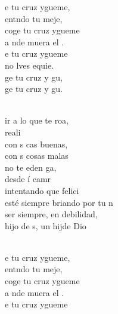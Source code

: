 \begin{cancion}%
	\begin{chorus}%
	e tu cruz ygueme,  \\
	entndo tu meje, \\
	coge tu cruz ygueme  \\
	a nde muera el . \\
	e tu cruz ygueme  \\
	no lves equie. \\
	ge tu cruz y gu, \\
	ge tu cruz y gu. \\
	\end{chorus}%
	\jump\\
	ir a lo que te roa, \\
	 reali \\
	con s cas buenas, \\
	con s cosas malas \\
	no te eden ga, \\
	desde í camr \\
	intentando que  felici \\
	esté siempre briando por tu n  \\
	 ser siempre, en debilidad, \\
	 hijo de s, un hijde Dio\\\jump\\
	\begin{chorus}%
	e tu cruz ygueme,  \\
	entndo tu meje, \\
	coge tu cruz ygueme  \\
	a nde muera el . \\
	e tu cruz ygueme  \\

\end{chorus}
\end{cancion}
